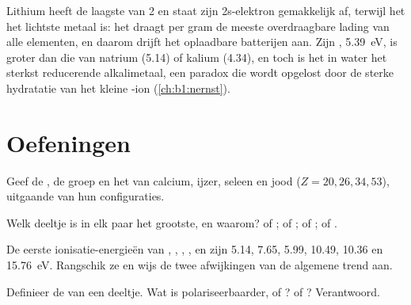 \begin{example}\label{ex:b1:periodicity:lithium}
Lithium heeft de laagste  van  2 en staat zijn
2s-elektron gemakkelijk af, terwijl het het lichtste metaal is: het
draagt per gram de meeste overdraagbare lading van alle elementen, en
daarom drijft het oplaadbare batterijen aan. Zijn , \qty{5.39}{eV}, is groter dan die van natrium (5.14)
of kalium (4.34), en toch is het in water het sterkst reducerende
alkalimetaal, een paradox die wordt opgelost door de sterke hydratatie
van het kleine -ion (\cref{ch:b1:nernst}).
\end{example}


\section{Oefeningen}

\begin{exercise}[$\star$]\label{exo:b1:periodicity:1}
Geef de , de groep en het  van calcium, ijzer, seleen en jood
($Z = 20, 26, 34, 53$), uitgaande van hun configuraties.
\end{exercise}

\begin{exercise}[$\star$]\label{exo:b1:periodicity:2}
Welk deeltje is in elk paar het grootste, en waarom?  of ;
 of ;  of ;  of .
\end{exercise}

\begin{exercise}[$\star$]\label{exo:b1:periodicity:3}
De eerste ionisatie-energieën van , , , ,
 en  zijn 5.14, 7.65, 5.99, 10.49, 10.36 en
\qty{15.76}{eV}. Rangschik ze en wijs de twee afwijkingen van de
algemene trend aan.
\end{exercise}

\begin{exercise}[$\star$]\label{exo:b1:periodicity:4}
Definieer de  van een deeltje. Wat is polariseerbaarder,
 of ?  of ? Verantwoord.
\end{exercise}

